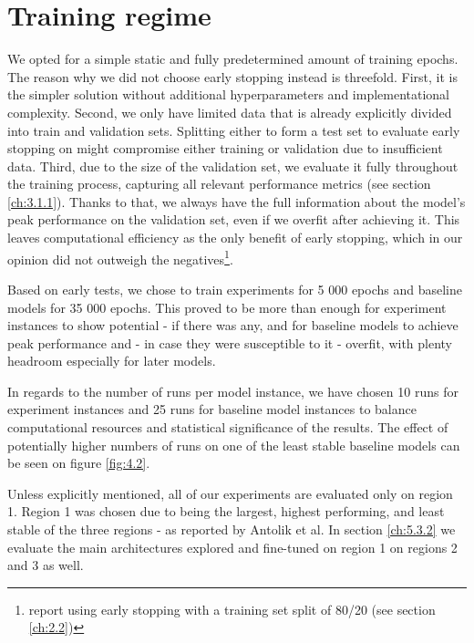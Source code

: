 \section{Training regime}\label{ch:4.4}

We opted for a simple static and fully predetermined amount of training epochs. The reason why we did not choose early stopping instead is threefold. First, it is the simpler solution without additional hyperparameters and implementational complexity. Second, we only have limited data that is already explicitly divided into train and validation sets. Splitting either to form a test set to evaluate early stopping on might compromise either training or validation due to insufficient data. Third, due to the size of the validation set, we evaluate it fully throughout the training process, capturing all relevant performance metrics (see section \ref{ch:3.1.1}). Thanks to that, we always have the full information about the model’s peak performance on the validation set, even if we overfit after achieving it. This leaves computational efficiency as the only benefit of early stopping, which in our opinion did not outweigh the negatives\footnote{\cite{klindt} report using early stopping with a training set split of 80/20 (see section \ref{ch:2.2})}.

Based on early tests, we chose to train experiments for 5 000 epochs and baseline models for 35 000 epochs. This proved to be more than enough for experiment instances to show potential - if there was any, and for baseline models to achieve peak performance and - in case they were susceptible to it - overfit, with plenty headroom especially for later models. 

In regards to the number of runs per model instance, we have chosen 10 runs for experiment instances and 25 runs for baseline model instances to balance computational resources and statistical significance of the results. The effect of potentially higher numbers of runs on one of the least stable baseline models can be seen on figure \ref{fig:4.2}.

Unless explicitly mentioned, all of our experiments are evaluated only on region 1. Region 1 was chosen due to being the largest, highest performing, and least stable of the three regions - as reported by Antolik et al. In section \ref{ch:5.3.2} we evaluate the main architectures explored and fine-tuned on region 1 on regions 2 and 3 as well.

